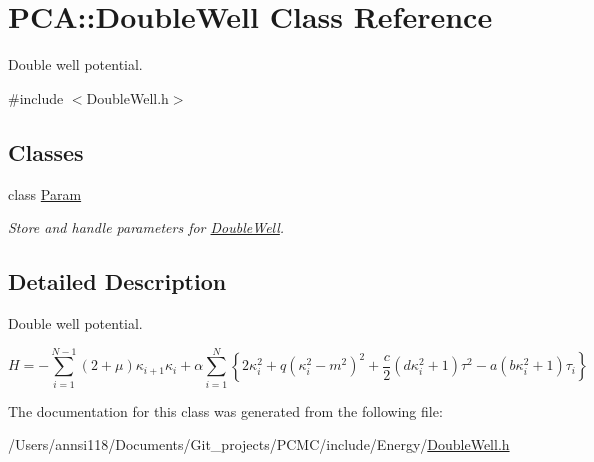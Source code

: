 \hypertarget{class_p_c_a_1_1_double_well}{}\section{P\+CA\+:\+:Double\+Well Class Reference}
\label{class_p_c_a_1_1_double_well}


Double well potential.  




{\ttfamily \#include $<$Double\+Well.\+h$>$}

\subsection*{Classes}
\begin{DoxyCompactItemize}
\item 
class \hyperlink{class_p_c_a_1_1_double_well_1_1_param}{Param}
\begin{DoxyCompactList}\small\item\em Store and handle parameters for \hyperlink{class_p_c_a_1_1_double_well}{Double\+Well}. \end{DoxyCompactList}\end{DoxyCompactItemize}


\subsection{Detailed Description}
Double well potential. 

\[ H=-\sum_{i=1}^{N-1} (2+\mu)\kappa_{i+1} \kappa_i + \alpha\sum_{i=1}^{N} \left\{ 2\kappa_i ^2 + q ( \kappa_i^2-m^2)^2+ \frac{c}{2}(d \kappa_i^2+1) \tau^2-a(b\kappa_i^2+1)\tau_i\right\} \] 

The documentation for this class was generated from the following file\+:\begin{DoxyCompactItemize}
\item 
/\+Users/annsi118/\+Documents/\+Git\+\_\+projects/\+P\+C\+M\+C/include/\+Energy/\hyperlink{_double_well_8h}{Double\+Well.\+h}\end{DoxyCompactItemize}
